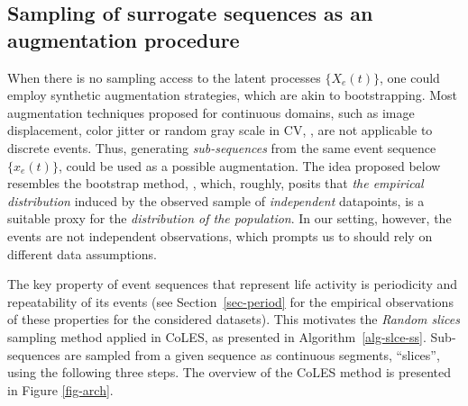 \documentclass[sigconf, anonymous]{acmart}
\begin{document}
\subsection{Sampling of surrogate sequences as an augmentation procedure} \label{sec-pos-pairs}

When there is no sampling access to the latent processes $\{X_e(t)\}$, one could employ synthetic
augmentation strategies, which are akin to bootstrapping. Most augmentation techniques proposed
for continuous domains, such as image displacement, color jitter or random gray scale in CV, \citep{Falcon2020AFF},
are not applicable to discrete events. Thus, generating \emph{sub-sequences} from the same event
sequence $\{x_e(t)\}$, could be used as a possible augmentation.
%
The idea proposed below resembles the bootstrap method, \citep{Efron1994Bootstrap}, which, roughly,
posits that \emph{the empirical distribution} induced by the observed sample of \emph{independent}
datapoints, is a suitable proxy for the \emph{distribution of the population}.
% 
In our setting, however, the events are not independent observations, which prompts us to should
rely on different data assumptions.

The key property of event sequences that represent life activity is periodicity and repeatability
of its events (see Section~\ref{sec-period} for the empirical observations of these properties
for the considered datasets). This motivates the \emph{Random slices} sampling method applied
in CoLES, as presented in Algorithm~\ref{alg-slce-ss}. Sub-sequences are sampled from a given
sequence as continuous segments, ``slices'', using the following three steps.
The overview of the CoLES method is presented in Figure \ref{fig-arch}.
\end{document}
